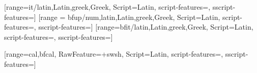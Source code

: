 [range={it/{latin,Latin,greek,Greek}},%
Script=Latin, script-features={}, sscript-features={}]
[range = {bfup/{num,latin,Latin,greek,Greek}},%
Script=Latin, script-features={}, sscript-features={}]
[range={bfit/{latin,Latin,greek,Greek}},%
Script=Latin, script-features={}, sscript-features={}]

\newfontface{}
[range={cal,bfcal}, RawFeature={+swsh},
Script=Latin, script-features={}, sscript-features={}]


\checkandfixthelayout
\sloppybottom
\strictpagechecktrue


\setsecheadstyle{\large\bfseries\sffamily\raggedright}
\setsubsecheadstyle{\normalsize\bfseries\sffamily\raggedright}

\renewcommand*{\chaptitlefont}{\Large\sffamily\bfseries\raggedright}
\renewcommand*{\chapnumfont}{\chaptitlefont}    %
\renewcommand*{\chapnamefont}{\chaptitlefont}   %

\usepackage{titling}
\pretitle{\begin{center}\sffamily\LARGE}
\posttitle{\end{center}}
\preauthor{\begin{center}\sffamily\large}
\postauthor{\end{center}}
\predate{\begin{center}\sffamily}
\postdate{\end{center}}
\setlength{\droptitle}{-6em}

\AtEndDocument{\ifnum\value{page} = 1\thispagestyle{empty}\fi}


\usepackage{graphicx}

\changecaptionwidth

